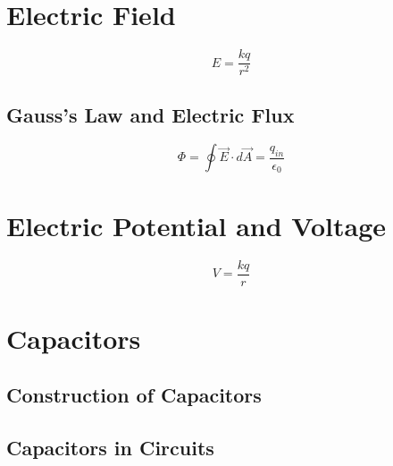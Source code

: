 	
	\section{Electric Field}  
	
		\begin{mdframed}[backgroundcolor=orange!20!white]
		
		\begin{equation}
		{E} = \frac{kq}{r^2}
		\label{equation:electrostaticfield}
		\end{equation}
	\end{mdframed}	
	
	\subsection{Gauss's Law and Electric Flux}
	
			\begin{mdframed}[backgroundcolor=orange!20!white]
			\begin{equation}
		\Phi = \oint{\vec{E} \cdot d\vec{A}} = \frac{q_{in}}{\epsilon_0}
		\label{equation:gausslaw}
	\end{equation}
	\end{mdframed}		
	
	\section{Electric Potential and Voltage}
	
		\begin{mdframed}[backgroundcolor=orange!20!white]
	
	\begin{equation}
	V = \frac{kq}{r}
	\label{equation:electrostaticpotential}
	\end{equation}
\end{mdframed}	
	
	\section{Capacitors}
		\subsection{Construction of Capacitors}
		\subsection{Capacitors in Circuits}
		
	
	
	

	


